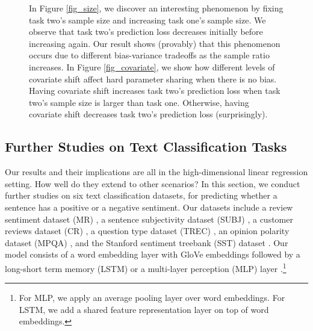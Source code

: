 \begin{figure}[!t]
{	In Figure \ref{fig_size}, we discover an interesting phenomenon by fixing task two's sample size and increasing task one's sample size.
	We observe that task two's prediction loss decreases initially before increasing again. Our result shows (provably) that this phenomenon occurs due to different bias-variance tradeoffs as the sample ratio increases.
	In Figure \ref{fig_covariate}, we show how different levels of covariate shift affect hard parameter sharing when there is no bias.
	Having covariate shift increases task two's prediction loss when task two's sample size is larger than task one. Otherwise, having covariate shift decreases task two's prediction loss (surprisingly).}
	\label{fig_model_shift_phasetrans}
\end{figure}


\subsection{Further Studies on Text Classification Tasks}\label{sec_text}

Our results and their implications are all in the high-dimensional linear regression setting.
How well do they extend to other scenarios?
In this section, we conduct further studies on six text classification datasets, for predicting whether a sentence has a positive or a negative sentiment.
Our datasets include a review sentiment dataset (MR) \cite{pang2005seeing}, a sentence subjectivity dataset (SUBJ) \cite{pang2004sentimental}, a customer reviews dataset (CR) \cite{hu2004mining}, a question type dataset (TREC) \cite{li2002learning}, an opinion polarity dataset (MPQA) \cite{wiebe2005annotating}, and the Stanford sentiment treebank (SST) dataset \cite{socher2013recursive}.
Our model consists of a word embedding layer with GloVe embeddings \cite{pennington2014glove} followed by a long-short term memory (LSTM) or a multi-layer perception (MLP) layer \cite{lei2018simple}.\footnote{For MLP, we apply an average pooling layer over word embeddings. For LSTM, we add a shared feature representation layer on top of word embeddings.}

